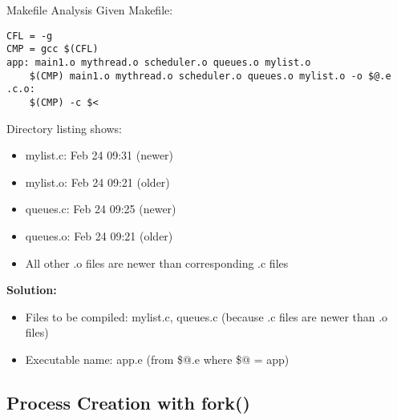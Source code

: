 \begin{example2}{Makefile Analysis}
    Given Makefile:
    
\begin{lstlisting}[style=basesmol]
CFL = -g
CMP = gcc $(CFL)
app: main1.o mythread.o scheduler.o queues.o mylist.o
	$(CMP) main1.o mythread.o scheduler.o queues.o mylist.o -o $@.e
.c.o:
	$(CMP) -c $<
\end{lstlisting}

    Directory listing shows:
    \begin{itemize}
        \item mylist.c: Feb 24 09:31 (newer)
        \item mylist.o: Feb 24 09:21 (older)  
        \item queues.c: Feb 24 09:25 (newer)
        \item queues.o: Feb 24 09:21 (older)
        \item All other .o files are newer than corresponding .c files
    \end{itemize}
    
    \tcblower
    
    \textbf{Solution:}
    \begin{itemize}
        \item Files to be compiled: mylist.c, queues.c (because .c files are newer than .o files)
        \item Executable name: app.e (from \$@.e where \$@ = app)
    \end{itemize}
\end{example2}

\subsection{Process Creation with fork()}

